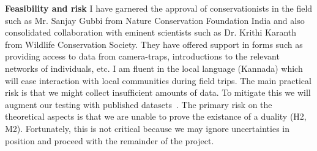 \documentclass[a4paper,10pt,twocolumn]{article}
\newcommand{\hdg}[1] {\noindent \textbf{#1} }
\begin{document}
\hdg{Feasibility and risk}
I have garnered the approval of conservationists in the field such as Mr. Sanjay Gubbi from Nature Conservation Foundation India and also consolidated collaboration with eminent scientists such as Dr. Krithi Karanth from Wildlife Conservation Society. They have offered support in forms such as providing access to data from camera-traps, introductions to the relevant networks of individuals, etc. I am fluent in the local language (Kannada) which will ease interaction with local communities during field trips. The main practical risk is that we might collect insufficient amounts of data. To mitigate this we will augment our testing with published datasets~\cite{yu2013automated}. The primary risk on the theoretical aspects is that we are unable to prove the existance of a duality (H2, M2). Fortunately, this is not critical because we may ignore uncertainties in position and proceed with the remainder of the project.



% 
% 
% 
% 
% 
% 
% 
% 



\vspace{-1em}
% 
{  }

\end{document}

